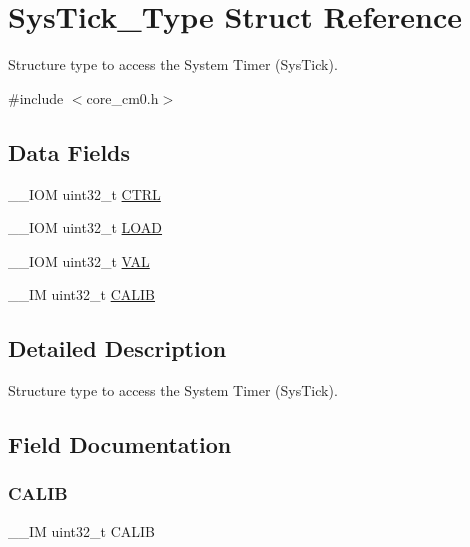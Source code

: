 \hypertarget{struct_sys_tick___type}{}\section{Sys\+Tick\+\_\+\+Type Struct Reference}
\label{struct_sys_tick___type}


Structure type to access the System Timer (Sys\+Tick).  




{\ttfamily \#include $<$core\+\_\+cm0.\+h$>$}

\subsection*{Data Fields}
\begin{DoxyCompactItemize}
\item 
\+\_\+\+\_\+\+I\+OM uint32\+\_\+t \mbox{\hyperlink{struct_sys_tick___type_ac81efc171e9852a36caeb47122bfec5b}{C\+T\+RL}}
\item 
\+\_\+\+\_\+\+I\+OM uint32\+\_\+t \mbox{\hyperlink{struct_sys_tick___type_a0c1333686137b7e25a46bd548a5b5bc3}{L\+O\+AD}}
\item 
\+\_\+\+\_\+\+I\+OM uint32\+\_\+t \mbox{\hyperlink{struct_sys_tick___type_ae7a655a853654127f3dfb7fa32c3f457}{V\+AL}}
\item 
\+\_\+\+\_\+\+IM uint32\+\_\+t \mbox{\hyperlink{struct_sys_tick___type_aedf0dff29a9cacdaa2fb7eec6b116a13}{C\+A\+L\+IB}}
\end{DoxyCompactItemize}


\subsection{Detailed Description}
Structure type to access the System Timer (Sys\+Tick). 

\subsection{Field Documentation}
\mbox{\label{struct_sys_tick___type_aedf0dff29a9cacdaa2fb7eec6b116a13}} 
\subsubsection{\texorpdfstring{C\+A\+L\+IB}{CALIB}}
{\footnotesize\ttfamily \+\_\+\+\_\+\+IM uint32\+\_\+t C\+A\+L\+IB}

